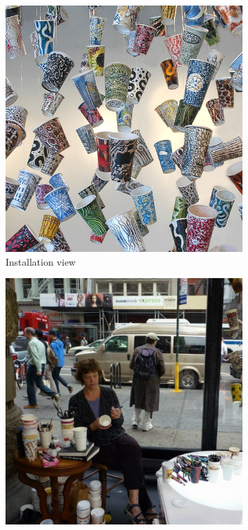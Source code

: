 \begin{figure}[h!]
\centering
\begin{subfigure}{.47\textwidth}
  \centering
  \includegraphics[width=\linewidth]{graphics/Gwyneth-Leech-cup5.jpg}
  \caption{Installation view}
  \label{fig:GwynethLeech_Installation}
\end{subfigure}
\hfill
\begin{subfigure}{.47\textwidth}
  \centering
  \includegraphics[width=\linewidth]{graphics/Gwyneth-Leech-cup3.jpg}

\end{subfigure}
\end{figure}
